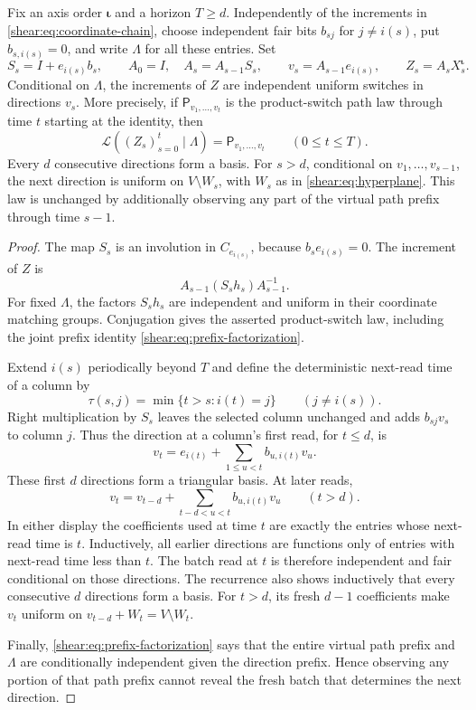 \begin{lemma}\label{shear:lem:keys}
Fix an axis order $\boldsymbol\iota$ and a horizon $T\ge d$. Independently
of the increments in \eqref{shear:eq:coordinate-chain}, choose
independent fair bits $b_{sj}$ for $j\ne i(s)$, put
$b_{s,i(s)}=0$, and write $\Lambda$ for all these entries. Set
\[
 S_s=I+e_{i(s)}b_s,\qquad
 A_0=I,\quad A_s=A_{s-1}S_s,\qquad
 v_s=A_{s-1}e_{i(s)},\qquad
 Z_s=A_sX^{\boldsymbol\iota}_s.
\]
Conditional on $\Lambda$, the increments of $Z$ are independent
uniform switches in directions $v_s$. More precisely, if
$\mathsf P_{v_1,\ldots,v_t}$ is the product-switch path law
through time $t$ starting at the identity, then
\begin{equation}\label{shear:eq:prefix-factorization}
 \mathcal L((Z_s)_{s=0}^t\mid\Lambda)
 =\mathsf P_{v_1,\ldots,v_t}\qquad(0\le t\le T).
\end{equation}
Every $d$ consecutive directions form a basis. For $s>d$,
conditional on $v_1,\ldots,v_{s-1}$, the next direction is
uniform on $V\setminus W_s$, with $W_s$ as in
\eqref{shear:eq:hyperplane}. This law is unchanged by additionally
observing any part of the virtual path prefix through time $s-1$.
\end{lemma}
\begin{proof}
The map $S_s$ is an involution in $C_{e_{i(s)}}$, because
$b_se_{i(s)}=0$. The increment of $Z$ is
\[
 A_{s-1}(S_sh_s)A_{s-1}^{-1}.
\]
For fixed $\Lambda$, the factors $S_sh_s$ are independent and
uniform in their coordinate matching groups. Conjugation gives
the asserted product-switch law, including the joint prefix
identity \eqref{shear:eq:prefix-factorization}.

Extend $i(s)$ periodically beyond $T$ and define the deterministic
next-read time of a column by
\[
 \tau(s,j)=\min\{t>s:i(t)=j\}\qquad(j\ne i(s)).
\]
Right multiplication by $S_s$ leaves the selected column
unchanged and adds $b_{sj}v_s$ to column $j$. Thus the direction
at a column's first read, for $t\le d$, is
\[
 v_t=e_{i(t)}+\sum_{1\le u<t}b_{u,i(t)}v_u.
\]
These first $d$ directions form a triangular basis. At later
reads,
\begin{equation}\label{shear:eq:key-recurrence}
 v_t=v_{t-d}+\sum_{t-d<u<t}b_{u,i(t)}v_u\qquad(t>d).
\end{equation}
In either display the coefficients used at time $t$ are exactly
the entries whose next-read time is $t$. Inductively, all earlier
directions are functions only of entries with next-read time
less than $t$. The batch read at $t$ is therefore independent
and fair conditional on those directions. The recurrence also
shows inductively that every consecutive $d$ directions form a
basis. For $t>d$, its fresh $d-1$ coefficients make $v_t$
uniform on
$v_{t-d}+W_t=V\setminus W_t$.

Finally, \eqref{shear:eq:prefix-factorization} says that the
entire virtual path prefix and $\Lambda$ are conditionally
independent given the direction prefix. Hence observing any
portion of that path prefix cannot reveal the fresh batch that
determines the next direction.
\end{proof}

